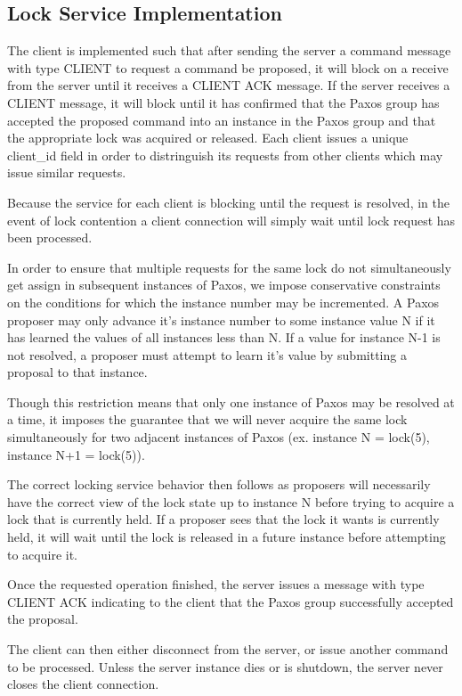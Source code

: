 \documentclass{article}
\begin{document}
\subsection{Lock Service Implementation}

The client is implemented such that after sending the server a command message with type CLIENT to request a command be proposed, it will block on a receive from the server until it receives a CLIENT ACK message.
If the server receives a CLIENT message, it will block until it has confirmed that the Paxos group has accepted the proposed command into an instance in the Paxos group and that the appropriate lock was acquired or released.
Each client issues a unique client\_id field in order to distringuish its requests from other clients which may issue similar requests.

Because the service for each client is blocking until the request is resolved, in the event of lock contention a client connection will simply wait until lock request has been processed.

In order to ensure that multiple requests for the same lock do not simultaneously get assign in subsequent instances of Paxos, we impose conservative constraints on the conditions for which the instance number may be incremented.
A Paxos proposer may only advance it's instance number to some instance value N if it has learned the values of all instances less than N.
If a value for instance N-1 is not resolved, a proposer must attempt to learn it's value by submitting a proposal to that instance.

Though this restriction means that only one instance of Paxos may be resolved at a time, it imposes the guarantee that we will never acquire the same lock simultaneously for two adjacent instances of Paxos (ex. instance N = lock(5), instance N+1 = lock(5)).

The correct locking service behavior then follows as proposers will necessarily have the correct view of the lock state up to instance N before trying to acquire a lock that is currently held.
If a proposer sees that the lock it wants is currently held, it will wait until the lock is released in a future instance before attempting to acquire it.

Once the requested operation finished, the server issues a message with type CLIENT ACK indicating to the client that the Paxos group successfully accepted the proposal.

The client can then either disconnect from the server, or issue another command to be processed.
Unless the server instance dies or is shutdown, the server never closes the client connection.
\end{document}
